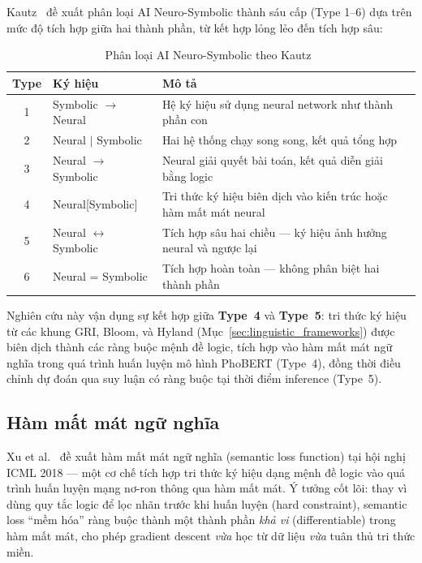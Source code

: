 Kautz~\cite{kautz2022third} đề xuất phân loại AI Neuro-Symbolic thành sáu cấp (Type 1--6) dựa trên mức độ tích hợp giữa hai thành phần, từ kết hợp lỏng lẻo đến tích hợp sâu:

\begin{table}[htbp]
\centering
\caption{Phân loại AI Neuro-Symbolic theo Kautz~\cite{kautz2022third}}
\label{tab:kautz_taxonomy}
\small
\renewcommand{\arraystretch}{1.2}
\begin{tabular}{|c|l|p{8cm}|}
\hline
\textbf{Type} & \textbf{Ký hiệu} & \textbf{Mô tả} \\
\hline
1 & Symbolic $\rightarrow$ Neural & Hệ ký hiệu sử dụng neural network như thành phần con \\
\hline
2 & Neural $|$ Symbolic & Hai hệ thống chạy song song, kết quả tổng hợp \\
\hline
3 & Neural $\rightarrow$ Symbolic & Neural giải quyết bài toán, kết quả diễn giải bằng logic \\
\hline
4 & Neural[Symbolic] & Tri thức ký hiệu biên dịch vào kiến trúc hoặc hàm mất mát neural \\
\hline
5 & Neural $\leftrightarrow$ Symbolic & Tích hợp sâu hai chiều --- ký hiệu ảnh hưởng neural và ngược lại \\
\hline
6 & Neural = Symbolic & Tích hợp hoàn toàn --- không phân biệt hai thành phần \\
\hline
\end{tabular}
\end{table}

Nghiên cứu này vận dụng sự kết hợp giữa \textbf{Type~4} và \textbf{Type~5}: tri thức ký hiệu từ các khung GRI, Bloom, và Hyland (Mục~\ref{sec:linguistic_frameworks}) được biên dịch thành các ràng buộc mệnh đề logic, tích hợp vào hàm mất mát ngữ nghĩa trong quá trình huấn luyện mô hình PhoBERT (Type~4), đồng thời điều chỉnh dự đoán qua suy luận có ràng buộc tại thời điểm inference (Type~5).


\subsection{Hàm mất mát ngữ nghĩa}
\label{subsec:semantic_loss}

Xu et al.~\cite{xu2018semantic} đề xuất hàm mất mát ngữ nghĩa (semantic loss function) tại hội nghị ICML 2018 --- một cơ chế tích hợp tri thức ký hiệu dạng mệnh đề logic vào quá trình huấn luyện mạng nơ-ron thông qua hàm mất mát. Ý tưởng cốt lõi: thay vì dùng quy tắc logic để lọc nhãn trước khi huấn luyện (hard constraint), semantic loss ``mềm hóa'' ràng buộc thành một thành phần \textit{khả vi} (differentiable) trong hàm mất mát, cho phép gradient descent \textit{vừa} học từ dữ liệu \textit{vừa} tuân thủ tri thức miền.


